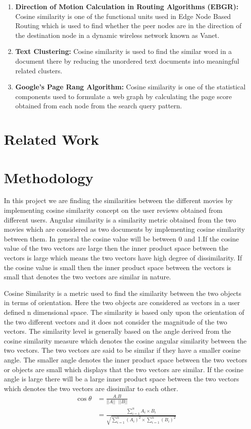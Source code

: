 \documentclass[12pt, titlepage, onecolumn]{article}
\begin{document}
{\begin{enumerate}
	\item {\bf Direction of Motion Calculation in Routing Algorithms (EBGR): }Cosine similarity is one of the functional units used in Edge Node Based Routing which is used to find whether the peer nodes are in the direction of the destination node in a dynamic wireless network known as Vanet.
	
	\item {\bf Text Clustering: }Cosine similarity is used to find the similar word in a document there by reducing the unordered text documents into meaningful related clusters.
	
	\item{\bf Google's Page Rang Algorithm: }Cosine similarity is one of the statistical components used to formulate a web graph by calculating the page score obtained from each node from the search query pattern.

\end{enumerate}
\section{Related Work}


\section{Methodology}
In this project we are finding the similarities between the different movies by implementing cosine similarity concept on the user reviews obtained from different users. Angular similarity is a similarity metric obtained from the two movies which are considered as two documents by implementing cosine similarity between them. In general the cosine value will be between 0 and 1.If the cosine value of the two vectors are large then the inner product space between the vectors is large which means the two vectors have high degree of dissimilarity. If the cosine value is small then the inner product space between the vectors is small that denotes the two vectors are similar in nature.

Cosine Similarity\cite{dke} is a metric used to find the similarity between the two objects in terms of orientation. Here the two objects are considered as vectors in a user defined n dimensional space. The similarity is based only upon the orientation of the two different vectors and it does not consider the magnitude of the two vectors. The similarity level is generally based on the angle derived from the cosine similarity measure which denotes the cosine angular similarity between the two vectors. The two vectors are said to be similar if they have a smaller cosine angle. The smaller angle denotes the inner product space between the two vectors or objects are small which displays that the two vectors are similar. If the cosine angle is large there will be a large inner product space between the two vectors which denotes the two vectors are dissimilar to each other. 
\begin{align*}
\cos \theta &= \frac{A.B}{||A|| \text{ }||B|| }\\
&= \frac{\sum_{i=1}^{n} A_{i} \times B_{i}}{\sqrt{\sum_{i=1}^{n}(A_{i})^{2} \times \sum_{i=1}^{n}(B_{i})^{2}}}
\end{align*}

}
\end{document}
